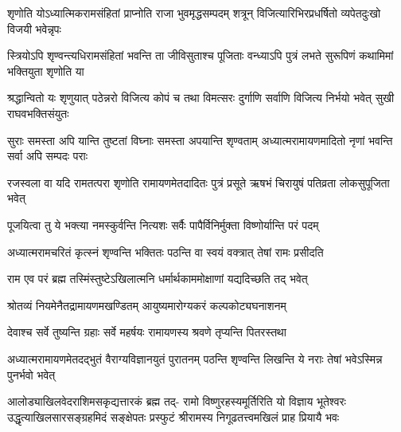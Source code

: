 \fourlineindentedshloka
{शृणोति योऽध्यात्मिकरामसंहितां}
{प्राप्नोति राजा भुवमृद्धसम्पदम्}
{शत्रून् विजित्यारिभिरप्रधर्षितो}
{व्यपेतदुःखो विजयी भवेन्नृपः} %

\fourlineindentedshloka
{स्त्रियोऽपि शृण्वन्त्यधिरामसंहितां}
{भवन्ति ता जीविसुताश्च पूजिताः}
{वन्ध्याऽपि पुत्रं लभते सुरूपिणं}
{कथामिमां भक्तियुता शृणोति या} %

\fourlineindentedshloka
{श्रद्धान्वितो यः शृणुयात् पठेन्नरो}
{विजित्य कोपं च तथा विमत्सरः}
{दुर्गाणि सर्वाणि विजित्य निर्भयो}
{भवेत् सुखी राघवभक्तिसंयुतः} %

\fourlineindentedshloka
{सुराः समस्ता अपि यान्ति तुष्टतां}
{विघ्नाः समस्ता अपयान्ति शृण्वताम्}
{अध्यात्मरामायणमादितो नृणां}
{भवन्ति सर्वा अपि सम्पदः पराः} %

\fourlineindentedshloka
{रजस्वला वा यदि रामतत्परा}
{शृणोति रामायणमेतदादितः}
{पुत्रं प्रसूते ऋषभं चिरायुषं}
{पतिव्रता लोकसुपूजिता भवेत्} %

\twolineshloka
{पूजयित्वा तु ये भक्त्या नमस्कुर्वन्ति नित्यशः}
{सर्वैः पापैर्विनिर्मुक्ता विष्णोर्यान्ति परं पदम्} %

\twolineshloka
{अध्यात्मरामचरितं कृत्स्नं शृण्वन्ति भक्तितः}
{पठन्ति वा स्वयं वक्त्रात् तेषां रामः प्रसीदति} %

\twolineshloka
{राम एव परं ब्रह्म तस्मिंस्तुष्टेऽखिलात्मनि}
{धर्मार्थकाममोक्षाणां यद्यदिच्छति तद् भवेत्} %

\twolineshloka
{श्रोतव्यं नियमेनैतद्रामायणमखण्डितम्}
{आयुष्यमारोग्यकरं कल्पकोट्यघनाशनम्} %

\twolineshloka
{देवाश्च सर्वे तुष्यन्ति ग्रहाः सर्वे महर्षयः}
{रामायणस्य श्रवणे तृप्यन्ति पितरस्तथा} %

\fourlineindentedshloka
{अध्यात्मरामायणमेतदद्भुतं}
{वैराग्यविज्ञानयुतं पुरातनम्}
{पठन्ति शृण्वन्ति लिखन्ति ये नराः}
{तेषां भवेऽस्मिन्न पुनर्भवो भवेत्} %

\fourlineindentedshloka
{आलोड्याखिलवेदराशिमसकृद्यत्तारकं ब्रह्म तद्-}
{रामो विष्णुरहस्यमूर्तिरिति यो विज्ञाय भूतेश्वरः}
{उद्धृत्याखिलसारसङ्ग्रहमिदं सङ्क्षेपतः प्रस्फुटं}
{श्रीरामस्य निगूढतत्त्वमखिलं प्राह प्रियायै भवः} %



